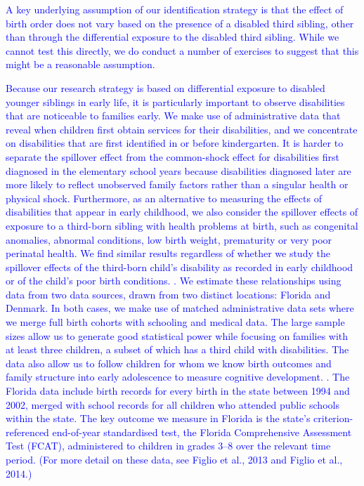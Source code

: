 \textcolor{blue}{A key underlying assumption of our identification strategy is that the effect of birth order does not vary based on the presence of a disabled third sibling, other than through the differential exposure to the disabled third sibling. While we cannot test this directly, we do conduct a number of exercises to suggest that this might be a reasonable assumption.

Because our research strategy is based on differential exposure to disabled younger siblings in early life, it is particularly important to observe disabilities that are noticeable to families early. We make use of administrative data that reveal when children first obtain services for their disabilities, and we concentrate on disabilities that are first identified in or before kindergarten. It is harder to separate the spillover effect from the common-shock effect for disabilities first diagnosed in the elementary school years because disabilities diagnosed later are more likely to reflect unobserved family factors rather than a singular health or physical shock. Furthermore, as an alternative to measuring the effects of disabilities that appear in early childhood, we also consider the spillover effects of exposure to a third-born sibling with health problems at birth, such as congenital anomalies, abnormal conditions, low birth weight, prematurity or very poor perinatal health. We find similar results regardless of whether we study the spillover effects of the third-born child’s disability as recorded in early childhood or of the child’s poor birth conditions.
.
We estimate these relationships using data from two data sources, drawn from two distinct locations: Florida and Denmark. In both cases, we make use of matched administrative data sets where we merge full birth cohorts with schooling and medical data. The large sample sizes allow us to generate good statistical power while focusing on families with at least three children, a subset of which has a third child with disabilities. The data also allow us to follow children for whom we know birth outcomes and family structure into early adolescence to measure cognitive development.
.
The Florida data include birth records for every birth in the state between 1994 and 2002, merged with school records for all children who attended public schools within the state. The key outcome we measure in Florida is the state’s criterion-referenced end-of-year standardised test, the Florida Comprehensive Assessment Test (FCAT), administered to children in grades 3–8 over the relevant time period. (For more detail on these data, see Figlio et al., 2013 and Figlio et al., 2014.)
}
